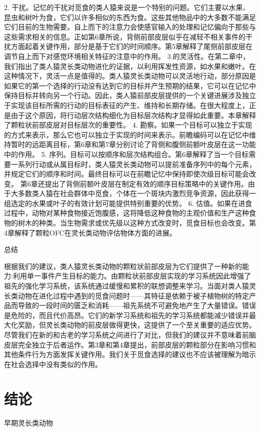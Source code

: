 2. 干扰。记忆的干扰对觅食的类人猿来说是一个特别的问题。它们主要以水果、昆虫和树叶为食，它们以许多相似的东西为食。这些其他物品中的大多数不能满足它们目前的生物需要。自上而下的注意力会使感官输入的处理和记忆偏向于那些与这些需求相关的信息。正如第6章所说，背侧前部皮层似乎在减轻不相关事件的干扰方面起着关键作用，部分是基于它们的时间顺序。第5章解释了尾侧前部皮层在调节自上而下对感觉环境相关特征的注意中的作用。
3.的灵活性。在第二章中，我们指出了类人猿灵长类动物进化的证据，以利用挥发性资源，如水果和嫩叶。在这种情况下，灵活一点是值得的。类人猿灵长类动物可以灵活地行动，部分原因是如果它的第一个选择的行动没有达到它的目标并产生预期的结果，它可以在记忆中保持目标并转向另一个行动。因此，类人猿前部皮层提供的一个关键进展涉及独立于实现该目标所需的行动的目标表征的产生、维持和长期存储。在很大程度上，正是由于这个原因，将行动层次结构细化为目标层次结构才显得如此重要。本章解释了颗粒状前部皮层对目标层次的重要性。
4. 勘察。如果一个目标可以独立于实现的方式来表示，那么它也可以独立于实现的时间来表示。前瞻编码可以在记忆中维持暂时的远距离目标，第6章和第7章分别讨论了背侧和腹侧前额叶皮层在这一功能中的作用。
5. 序列。目标可以按顺序和层次结构组合。第6章解释了当一个目标需要一系列行动或从属目标时，类人猿灵长类动物可以提前准备序列中的每个元素，并规定它们的顺序和时间。最终目标可以在前瞻记忆中保持即使次级目标可能会改变。
第6章还提出了背侧前额叶皮层在制定有效的顺序目标策略中的关键作用。由于大多数类人猿在社会群体中觅食，个体在一个斑块内激烈竞争资源，因此获得一组选定的水果或叶子的有效计划可能提供特别重要的优势。
6. 估值。如果在进食过程中，动物对某种食物接近饱腹感，这将降低这种食物的主观价值和生产这种食物的树木的种类。当生物需求或优先级以这种方式改变时，觅食目标也会改变。第4章解释了颗粒OFC在灵长类动物评估物体方面的进展。

总结

根据我们的建议，类人猿灵长类动物的颗粒状前部皮层为它们提供了一种新的能力:利用单一事件产生目标的能力。由颗粒状前部皮层实现的学习系统因此增强了祖先的强化学习系统，该系统通过缓慢和累积的联想调整来学习。当面对类人猿灵长类动物在进化过程中遇到的觅食问题时——其特征是依赖于被子植物树的特定产品而导致的一段时间的匮乏和消耗——祖先系统不可避免地产生了大量错误。错误是危险的，而且代价高昂。它们的新学习系统和祖先的学习系统都能减少错误并最大化奖励，但灵长类动物的前皮层做得更快，这提供了一个至关重要的适应优势。
尽管我们在新的和古老的学习系统之间进行了对比，但我们的建议并不意味着前脑皮层完全独立于后者运作。第3章和第4章提出，前部皮层的颗粒部分在影响习惯和其他条件行为方面发挥关键作用。我们关于觅食选择的建议也不应该被理解为暗示在社会选择中没有类似的作用。

\section{结论}
早期灵长类动物

